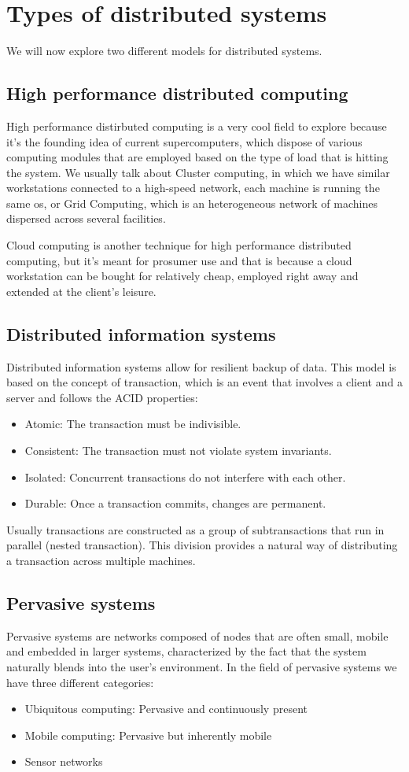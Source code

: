 \section{Types of distributed systems}
We will now explore two different models for distributed systems.
\subsection{High performance distributed computing}
High performance distirbuted computing is a very cool field to explore because it's the founding idea of current supercomputers, which dispose of various computing modules that are employed based on the type of load that is hitting the system. We usually talk about Cluster computing, in which we have similar workstations connected to a high-speed network, each machine is running the same os, or Grid Computing, which is an heterogeneous network of machines dispersed across several facilities.

Cloud computing is another technique for high performance distributed computing, but it's meant for prosumer use and that is because a cloud workstation can be bought for relatively cheap, employed right away and extended at the client's leisure.
\subsection{Distributed information systems}
Distributed information systems allow for resilient backup of data. This model is based on the concept of transaction, which is an event that involves a client and a server and follows the ACID properties:
\begin{itemize}
    \item Atomic: The transaction must be indivisible.
    \item Consistent: The transaction must not violate system invariants.
    \item Isolated: Concurrent transactions do not interfere with each other.
    \item Durable: Once a transaction commits, changes are permanent.
\end{itemize}
Usually transactions are constructed as a group of subtransactions that run in parallel (nested transaction). This division provides a natural way of distributing a transaction across multiple machines.
\subsection{Pervasive systems}
Pervasive systems are networks composed of nodes that are often small, mobile and embedded in larger systems, characterized by the fact that the system naturally blends into the user's environment. In the field of pervasive systems we have three different categories:
\begin{itemize}
    \item Ubiquitous computing: Pervasive and continuously present
    \item Mobile computing: Pervasive but inherently mobile
    \item Sensor networks
\end{itemize}
